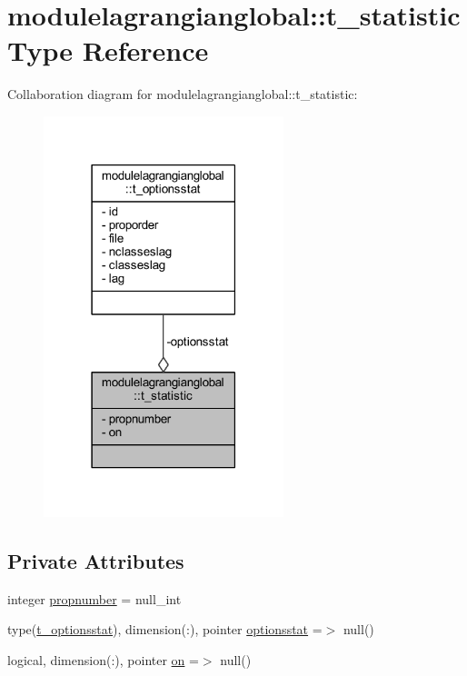 \hypertarget{structmodulelagrangianglobal_1_1t__statistic}{}\section{modulelagrangianglobal\+:\+:t\+\_\+statistic Type Reference}
\label{structmodulelagrangianglobal_1_1t__statistic}


Collaboration diagram for modulelagrangianglobal\+:\+:t\+\_\+statistic\+:\nopagebreak
\begin{figure}[H]
\begin{center}
\leavevmode
\includegraphics[width=198pt]{structmodulelagrangianglobal_1_1t__statistic__coll__graph}
\end{center}
\end{figure}
\subsection*{Private Attributes}
\begin{DoxyCompactItemize}
\item 
integer \mbox{\hyperlink{structmodulelagrangianglobal_1_1t__statistic_a4a154bdeeaab4292210187222f9f588e}{propnumber}} = null\+\_\+int
\item 
type(\mbox{\hyperlink{structmodulelagrangianglobal_1_1t__optionsstat}{t\+\_\+optionsstat}}), dimension(\+:), pointer \mbox{\hyperlink{structmodulelagrangianglobal_1_1t__statistic_a9aba736a31e977f264d0161502f87cbe}{optionsstat}} =$>$ null()
\item 
logical, dimension(\+:), pointer \mbox{\hyperlink{structmodulelagrangianglobal_1_1t__statistic_a8a87b491ce1de7b4464b1ca69fa8b7fb}{on}} =$>$ null()
\end{DoxyCompactItemize}


